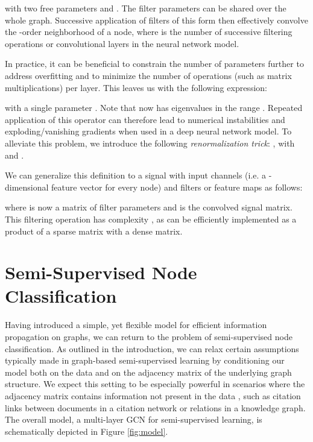 \documentclass{article} \usepackage{iclr2017_conference,times}
\makeatletter
\newcommand*{\ie}{i.e.\@\xspace}
\makeatother
\begin{document}
with two free parameters  and . The filter parameters can be shared over the whole graph. Successive application of filters of this form then effectively convolve the -order neighborhood of a node, where  is the number of successive filtering operations or convolutional layers in the neural network model.

In practice, it can be beneficial to constrain the number of parameters further to address overfitting and to minimize the number of operations (such as matrix multiplications) per layer. This leaves us with the following expression:

with a single parameter . Note that  now has eigenvalues in the range . Repeated application of this operator can therefore lead to numerical instabilities and exploding/vanishing gradients when used in a deep neural network model. To alleviate this problem, we introduce the following \textit{renormalization trick}: , with  and .

We can generalize this definition to a signal  with  input channels (\ie a -dimensional feature vector for every node) and  filters or feature maps as follows:

where  is now a matrix of filter parameters and  is the convolved signal matrix. This filtering operation has complexity , as  can be efficiently implemented as a product of a sparse matrix with a dense matrix.


\section{Semi-Supervised Node Classification}
Having introduced a simple, yet flexible model  for efficient information propagation on graphs, we can return to the problem of semi-supervised node classification. As outlined in the introduction, we can relax certain assumptions typically made in graph-based semi-supervised learning by conditioning our model  both on the data  and on the adjacency matrix  of the underlying graph structure. We expect this setting to be especially powerful in scenarios where the adjacency matrix contains information not present in the data , such as citation links between documents in a citation network or relations in a knowledge graph. The overall model, a multi-layer GCN for semi-supervised learning, is schematically depicted in Figure \ref{fig:model}.
\end{document}
